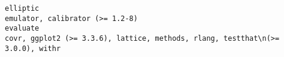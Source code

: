 \documentclass[
  letterpaper,
  DIV=11,
  numbers=noendperiod]{scrreprt}
\begin{document}
\begin{verbatim}
elliptic                                                                                                                                                                                                                                                                                                                                                                                                                                                                                                                                                                                                                                                                                                                                                                                                                                                                                                                                                                                                                                                                                                                                                                                                                                                                      emulator, calibrator (>= 1.2-8)
evaluate                                                                                                                                                                                                                                                                                                                                                                                                                                                                                                                                                                                                                                                                                                                                                                                                                                                                                                                                                                                                                                                                                                                                                                                                                       covr, ggplot2 (>= 3.3.6), lattice, methods, rlang, testthat\n(>= 3.0.0), withr

\end{verbatim}
\end{document}
